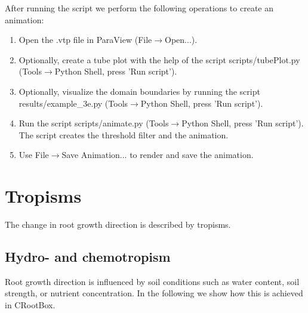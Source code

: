 \documentclass[a4paper]{article}
\begin{document}
After running the script we perform the following operations to create an animation:
\begin{enumerate}
 \item Open the .vtp file in ParaView (File$\rightarrow$Open...).
 \item Optionally, create a tube plot with the help of the script scripts/tubePlot.py (Tools$\rightarrow$Python Shell, press 'Run script').
 \item Optionally, visualize the domain boundaries by running the script results/example\_3e.py (Tools$\rightarrow$Python Shell, press 'Run script').
 \item Run the script scripts/animate.py (Tools$\rightarrow$Python Shell, press 'Run script'). The script creates the threshold filter and the animation. 
 \item Use File$\rightarrow$Save Animation... to render and save the animation.
\end{enumerate}


\section{Tropisms}

The change in root growth direction is described by tropisms. 


\subsection{Hydro- and chemotropism} \label{sec:hydro}

Root growth direction is influenced by soil conditions such as water content, soil strength, or nutrient concentration. 
In the following we show how this is achieved in CRootBox.


\end{document}
